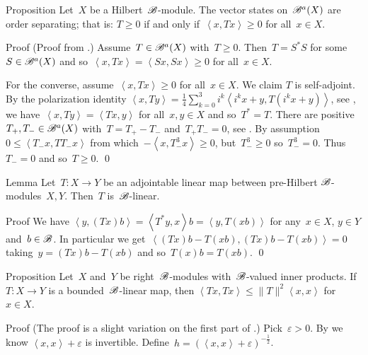 \documentclass[b]{subfiles}
\begin{document}
\begin{parsec}%
\begin{point}{Proposition}%
Let~$X$ be a Hilbert~$\mathscr{B}$-module.
The vector states on~$\mathscr{B}^a(X)$ are order separating;
that is: $T \geq 0$ if and only if~$\left<x,Tx\right> \geq 0$
for all~$x \in X$.
\begin{point}{Proof}%
(Proof from \cite[Lemma 4.1]{lance}.)
Assume~$T \in \mathscr{B}^a(X)$ with~$T \geq 0$.
Then~$T = S^*S$ for some~$S \in \mathscr{B}^a(X)$
    and so~$\left<x, Tx\right> = \left<Sx,Sx\right> \geq 0$
    for all~$x \in X$.

For the converse, assume~$\left<x, Tx\right> \geq 0$
    for all~$x \in X$.
We claim $T$ is self-adjoint.
By the polarization identity
$\left<x, Ty\right>
    = \frac{1}{4} \sum^3_{k=0} i^k \left< i^k x+y, T(i^k x+y)\right>$,
    see ,
    we have~$\left<x,Ty \right> = \left<Tx, y\right>$ for all~$x,y \in X$
    and so~$T^*=T$.
There are positive~$T_+,T_- \in \mathscr{B}^a(X)$
with~$T = T_+ - T_-$ and~$T_+T_- = 0$, see .
By assumption~$0 \leq \left<T_-x,TT_-x\right>$
    from which~$-\left<x,T_-^3x\right> \geq 0$,
    but~$T_-^3 \geq 0$ so~$T_-^3 = 0$.
    Thus~$T_- = 0$ and so~$T \geq 0$. \qed
\end{point}
\end{point}
\begin{point}{Lemma}%
Let~$T\colon X \to Y$
    be an adjointable linear map between pre-Hilbert $\mathscr{B}$-modules~$X,Y$.
Then~$T$ is~$\mathscr{B}$-linear.
\begin{point}{Proof}%
We have
    $\left<y, (Tx)b\right>
    =\left<T^*y, x\right>b
    =\left<y, T(xb)\right>$
for any~$x \in X$, $y \in Y$ and~$b \in \mathscr{B}$.
In particular we
get~$\left<(Tx)b-T(xb), (Tx)b-T(xb)\right>=0$
taking~$y = (Tx)b-T(xb)$
    and so~$T(x)b=T(xb)$. \qed
\end{point}
\end{point}
\begin{point}{Proposition}%
Let~$X$ and~$Y$ be right~$\mathscr{B}$-modules with~$\mathscr{B}$-valued
    inner products.
If~$T \colon X \to Y$ is a bounded~$\mathscr{B}$-linear map,
    then $\left<Tx,Tx\right>\leq \|T\|^2 \left<x,x\right>$
    for~$x \in X$.
\begin{point}{Proof}
(The proof is a slight variation on the first part
of \cite[Thm.~2.8]{paschke}.)
Pick~$\varepsilon > 0$.
By 
    we know $\left<x,x\right> + \varepsilon$ is invertible.
Define~$h = (\left<x,x\right> + \varepsilon)^{-\frac{1}{2}}$.

\end{point}
\end{point}
\end{parsec}
\end{document}

